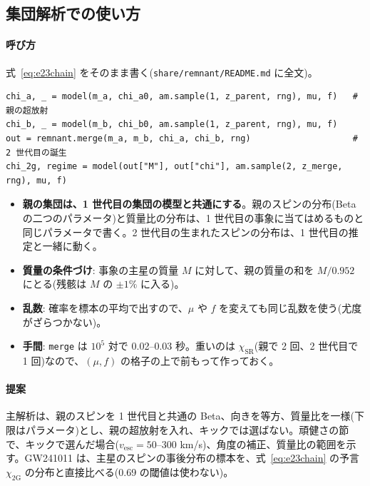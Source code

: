 \subsection{集団解析での使い方}

\paragraph{呼び方}
式~\eqref{eq:e23chain} をそのまま書く(\texttt{share/remnant/README.md} に全文)。
\begin{verbatim}
chi_a, _ = model(m_a, chi_a0, am.sample(1, z_parent, rng), mu, f)   # 親の超放射
chi_b, _ = model(m_b, chi_b0, am.sample(1, z_parent, rng), mu, f)
out = remnant.merge(m_a, m_b, chi_a, chi_b, rng)                    # 2 世代目の誕生
chi_2g, regime = model(out["M"], out["chi"], am.sample(2, z_merge, rng), mu, f)
\end{verbatim}
\begin{itemize}
\item \textbf{親の集団は、1 世代目の集団の模型と共通にする}。親のスピンの分布(Beta の二つのパラメータ)と質量比の分布は、1 世代目の事象に当てはめるものと同じパラメータで書く。2 世代目の生まれたスピンの分布は、1 世代目の推定と一緒に動く。
\item \textbf{質量の条件づけ}: 事象の主星の質量 $M$ に対して、親の質量の和を $M/0.952$ にとる(残骸は $M$ の $\pm1\%$ に入る)。
\item \textbf{乱数}: 確率を標本の平均で出すので、$\mu$ や $f$ を変えても同じ乱数を使う(尤度がざらつかない)。
\item \textbf{手間}: \texttt{merge} は $10^5$ 対で 0.02--0.03 秒。重いのは $\chi_\mathrm{SR}$(親で 2 回、2 世代目で 1 回)なので、$(\mu,f)$ の格子の上で前もって作っておく。
\end{itemize}

\paragraph{提案}
主解析は、親のスピンを 1 世代目と共通の Beta、向きを等方、質量比を一様(下限はパラメータ)とし、親の超放射を入れ、キックでは選ばない。頑健さの節で、キックで選んだ場合($v_\mathrm{esc}=50$--300 km/s)、角度の補正、質量比の範囲を示す。GW241011 は、主星のスピンの事後分布の標本を、式~\eqref{eq:e23chain} の予言 $\chi_\mathrm{2G}$ の分布と直接比べる(0.69 の閾値は使わない)。

